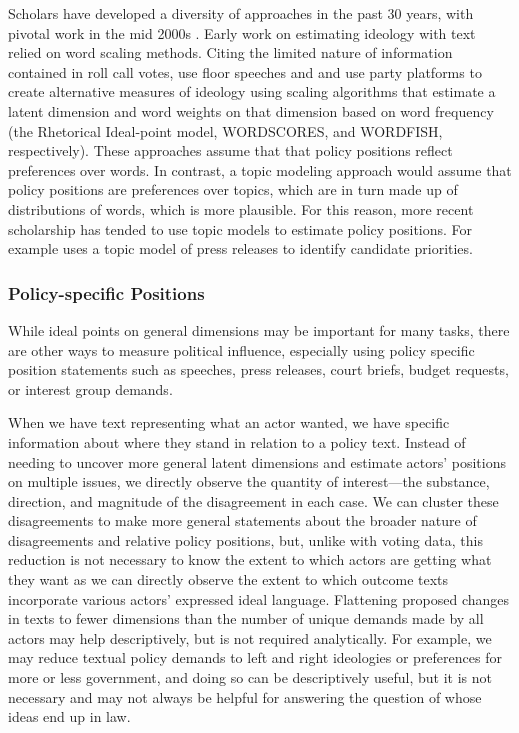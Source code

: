\documentclass{article}
\begin{document}
Scholars have developed a diversity of approaches in the past 30 years, with pivotal work in the mid 2000s \citep{Monroe2008a}. Early work on estimating ideology with text relied on word scaling methods. Citing the limited nature of information contained in roll call votes, \citet{Monroe2004} use floor speeches and \citet{Laver2003} and \citet{Slapin2008} use party platforms to create alternative measures of ideology using scaling algorithms that estimate a latent dimension and word weights on that dimension based on word frequency (the Rhetorical Ideal-point model, WORDSCORES, and WORDFISH, respectively). These approaches assume that that policy positions reflect preferences over words. In contrast, a topic modeling approach would assume that policy positions are preferences over topics, which are in turn made up of distributions of words, which is more plausible. For this reason, more recent scholarship has tended to use topic models to estimate policy positions. For example \citet{Grimmer2013} uses a topic model of press releases to identify candidate priorities. 


\subsubsection{Policy-specific Positions}
While ideal points on general dimensions may be important for many tasks, there are other ways to measure political influence, especially using policy specific position statements such as speeches, press releases, court briefs, budget requests, or interest group demands. 

When we have  text representing what an actor wanted, we have specific information about where they stand in relation to a policy text. Instead of needing to uncover more general latent dimensions and estimate actors' positions on multiple issues, we directly observe the quantity of interest---the substance, direction, and magnitude of the disagreement in each case. We can cluster these disagreements to make more general statements about the broader nature of disagreements and relative policy positions, but, unlike with voting data, this reduction is not necessary to know the extent to which actors are getting what they want as we can directly observe the extent to which outcome texts incorporate various actors' expressed ideal language. Flattening proposed changes in texts to fewer dimensions than the number of unique demands made by all actors may help descriptively, but is not required analytically. For example, we may reduce textual policy demands to left and right ideologies or preferences for more or less government, and doing so can be descriptively useful, but it is not necessary and may not always be helpful for answering the question of whose ideas end up in law.
\end{document}

